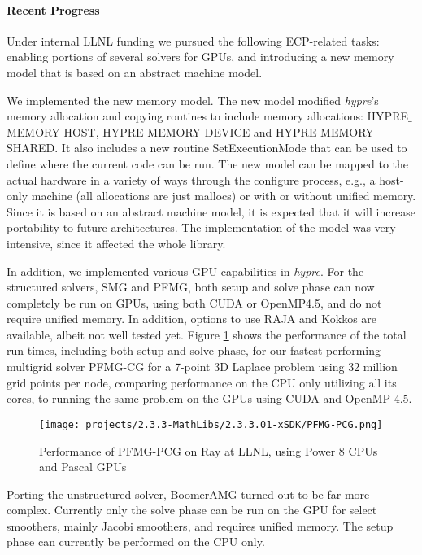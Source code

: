 \paragraph{Recent Progress}

Under internal LLNL funding we pursued the following ECP-related tasks: enabling portions of several solvers for GPUs, and introducing a new memory model that is based on an abstract machine model.

We  implemented the new memory model. The new model modified {\sl hypre}'s memory allocation and copying routines to include memory allocations: HYPRE$\_$MEMORY$\_$HOST, HYPRE$\_$MEMORY$\_$DEVICE and HYPRE$\_$MEMORY$\_$SHARED. It also includes a new routine SetExecutionMode that can be used to define where the current code can be run.
The new model can be mapped to the actual hardware in a variety of ways through the configure process, e.g., a host-only machine (all allocations are just mallocs) or with or without unified memory. Since it is based on an abstract machine model, it is expected that it will increase portability to future architectures. The implementation of the model was very intensive, since it affected the whole library. 

In addition, we implemented various GPU capabilities in {\sl hypre}. For the structured solvers, SMG and PFMG\cite{AsFa1996}, both setup and solve phase can now completely be run on GPUs, using both CUDA or OpenMP4.5, and do not require unified memory. In addition, options to use RAJA and Kokkos are available, albeit not well tested yet. Figure \ref{fig:pfmg} shows the performance of the total run times, including both setup and solve phase, for our fastest performing multigrid solver PFMG-CG for a 7-point 3D Laplace problem using 32 million grid points per node, comparing performance on the CPU only utilizing all its cores, to running the same problem on the GPUs using CUDA and OpenMP 4.5.

\begin{figure}
\centering
\texttt{[image: projects/2.3.3-MathLibs/2.3.3.01-xSDK/PFMG-PCG.png]}
\caption{\label{fig:pfmg} Performance of PFMG-PCG on Ray at LLNL, using Power 8 CPUs and Pascal GPUs}
\end{figure}

Porting the unstructured solver, BoomerAMG turned out to be far more complex. Currently only the solve phase can be run on the GPU for select smoothers, mainly Jacobi smoothers, and requires unified memory. The setup phase can currently be performed on the CPU only.


